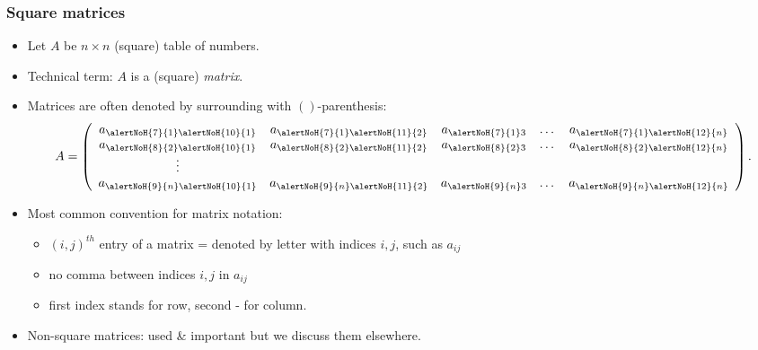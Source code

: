 \begin{frame}
\frametitle{Square matrices}
\begin{itemize}
\item Let $A$ be $n\times n$ (square) table of numbers.
\item<2-> Technical term: $A$ is a (square) \emph{matrix}.
\item<3-> Matrices are often denoted by surrounding with $\left(\right)$-parenthesis:
\[
A=\left(
\begin{array}{ccccc}
a_{\alertNoH{7}{1}\alertNoH{10}{1}} & a_{\alertNoH{7}{1}\alertNoH{11}{2}} & a_{\alertNoH{7}{1}3}& \dots & a_{\alertNoH{7}{1}\alertNoH{12}{n}}\\
a_{\alertNoH{8}{2}\alertNoH{10}{1}} & a_{\alertNoH{8}{2}\alertNoH{11}{2}} & a_{\alertNoH{8}{2}3}& \dots & a_{\alertNoH{8}{2}\alertNoH{12}{n}}\\
\vdots \\
a_{\alertNoH{9}{n}\alertNoH{10}{1}} & a_{\alertNoH{9}{n}\alertNoH{11}{2}} & a_{\alertNoH{9}{n}3}& \dots & a_{\alertNoH{9}{n}\alertNoH{12}{n}}
\end{array}
\right).
\]

\item<4-> Most common convention for matrix notation:
\begin{itemize}
\item $(i,j)^{th}$ entry of a matrix = denoted by letter with indices $i,j$, such as $a_{ij}$
\item<5-> no comma between indices $i,j$ in $a_{ij}$
\item<6-> first index stands for row, second - for column.
\end{itemize}
\item<13-> Non-square matrices: used \& important but we discuss them elsewhere.
\end{itemize}
\end{frame}



